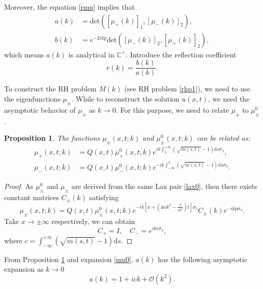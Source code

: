 \documentclass[11pt]{article}
\numberwithin{equation}{section}
\newtheorem{Proposition}{Proposition}
\begin{document}
Moreover, the equation \eqref{rmu} implies that
 \begin{align}
     a(k)&=\mathrm{det}\left(\left[\mu_{+}(k)\right]_1,\left[\mu_{-}(k)\right]_2\right),\label{ak}\\
b(k)&=e^{-2ikp}\mathrm{det}\left(\left[\mu_{-}(k)\right]_2,\left[\mu_{+}(k)\right]_2\right),\label{bk}
 \end{align}
 which means $a(k)$ is analytical in $\mathbb{C}^+$. Introduce the reflection coefficient
 \begin{equation}
     r(k)=\frac{b(k)}{a(k)}.
 \end{equation}

To construct the RH problem $M(k)$ (see RH problem \ref{rhp1}), we need to use the eigenfunctions $\mu_{\pm}$. While to reconstruct the solution $u(x,t)$, we need the asymptotic behavior of $\mu_{\pm}$ as $k\to0$. For this purpose, we need to relate $\mu_{\pm}$ to $\mu_{\pm}^0$.

 \begin{Proposition}\label{p3}
     The functions $\mu_{\pm}(x,t;k)$ and $\mu_{\pm}^0(x,t;k)$ can be related as:
     \begin{align}
          \mu_{+}(x,t;k)&=Q(x,t)\mu^0_+(x,t;k)e^{ik\int^{+\infty}_{x}\left(\sqrt{m(s,t)}-1\right)\mathrm{d}s\sigma_3},\\
          \mu_{-}(x,t;k)&=Q(x,t)\mu^0_-(x,t;k)e^{-ik\int_{-\infty}^{x}\left(\sqrt{m(s,t)}-1\right)\mathrm{d}s\sigma_3}.
     \end{align}
 \end{Proposition}
 \begin{proof}
     As $\mu^0_{\pm}$ and $\mu_{\pm}$ are derived from the same Lax pair \eqref{lax0}, then there exists constant matrices $C_{\pm}(k)$ satisfying
     \begin{equation}
         \mu_{\pm}(x,t;k)=Q(x,t)\mu^0_{\pm}(x,t;k)e^{-ik[x+(4\alpha k^2-\frac{\beta}{4k^2})t]\sigma_3}C_{\pm}(k)e^{-ikp\sigma_3}.
     \end{equation}
     Take $x\to\pm\infty$ respectively, we can obtain
     \begin{equation}
         C_+=I,\quad C_-=e^{ikc\sigma_3},
     \end{equation}
     where $c=\int^{+\infty}_{-\infty}(\sqrt{m(s,t)}-1)\mathrm{d}s$.
 \end{proof}
From Proposition \ref{p3} and expansion \eqref{mu0}, $a(k)$ has the following asymptotic expansion as $k\to0$
 \begin{equation}
     a(k)=1+ick+\mathcal{O}(k^2).\label{expanak}
 \end{equation}
\end{document}
